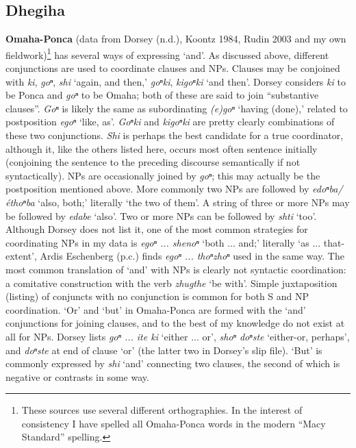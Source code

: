 \documentclass[output=paper]{LSP/langsci}
\begin{document}
\subsection{Dhegiha}
 
\textbf{Omaha-Ponca} (data from Dorsey (n.d.), Koontz 1984, Rudin 2003 and my own fieldwork)\footnote{These sources use several different orthographies. In the interest of consistency I have spelled all Omaha-Ponca words in the modern ``Macy Standard'' spelling.} has several ways of expressing `and'. As discussed above, different conjunctions are used to coordinate clauses and NPs. Clauses may be conjoined with \textit{ki}, \textit{goⁿ}, \textit{shi} `again, and then,' \textit{goⁿki}, \textit{kigoⁿki} `and then'. Dorsey considers \textit{ki} to be Ponca and \textit{goⁿ} to be Omaha; both of these are said to join ``substantive clauses''. \textit{Goⁿ} is likely the same as subordinating \textit{(e)goⁿ} `having (done),' related to postposition \textit{egoⁿ} `like, as'. \textit{Goⁿki} and \textit{kigoⁿki} are pretty clearly combinations of these two conjunctions. \textit{Shi} is perhaps the best candidate for a true coordinator, although it, like the others listed here, occurs most often sentence initially (conjoining the sentence to the preceding discourse semantically if not syntactically). NPs are occasionally joined by \textit{goⁿ}; this may actually be the postposition mentioned above. More commonly two NPs are followed by \textit{edoⁿba/\'ethoⁿba} `also, both;' literally `the two of them'. A string of three or more NPs may be followed by \textit{edabe} `also'. Two or more NPs can be followed by \textit{shti} `too'. Although Dorsey does not list it, one of the most common strategies for coordinating NPs in my data is \textit{egoⁿ ... shenoⁿ} `both ... and;' literally `as ... that-extent', Ardis Eschenberg (p.c.) finds \textit{egoⁿ ... thoⁿzhoⁿ} used in the same way. The most common translation of `and' with NPs is clearly not syntactic coordination: a comitative construction with the verb \textit{zhugthe} `be with'. Simple juxtaposition (listing) of conjuncts with no conjunction is common for both S and NP coordination. `Or' and `but' in Omaha-Ponca are formed with the `and' conjunctions for joining clauses, and to the best of my knowledge do not exist at all for NPs. Dorsey lists \textit{goⁿ ... ite ki} `either ... or', \textit{shoⁿ doⁿste} `either-or, perhaps', and \textit{doⁿste} at end of clause `or' (the latter two in Dorsey's slip file). `But' is commonly expressed by \textit{shi} `and' connecting two clauses, the second of which is negative or contrasts in some way.
\end{document}

